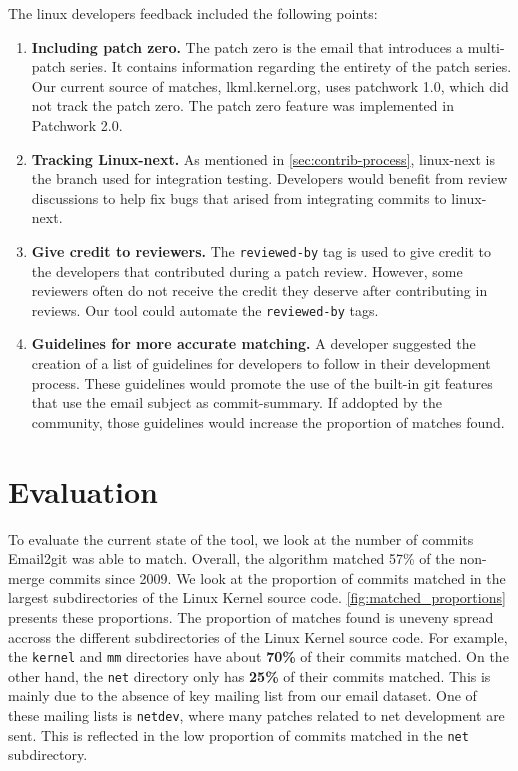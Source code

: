 The linux developers feedback included the following points:
\begin{enumerate}
	\item \textbf{Including patch zero.} The patch zero is the email that introduces a multi-patch series. It contains information regarding the entirety of the patch series. Our current source of matches, lkml.kernel.org, uses patchwork 1.0, which did not track the patch zero. The patch zero feature was implemented in Patchwork 2.0.

	\item \textbf{Tracking Linux-next.} As mentioned in \autoref{sec:contrib-process}, linux-next is the branch used for integration testing. Developers would benefit from review discussions to help fix bugs that arised from integrating commits to linux-next. 

	\item \textbf{Give credit to reviewers.} The \texttt{reviewed-by} tag is used to give credit to the developers that contributed during a patch review. However, some reviewers often do not receive the credit they deserve after contributing in reviews. Our tool could automate the \texttt{reviewed-by} tags.

	\item \textbf{Guidelines for more accurate matching.} A developer suggested the creation of a list of guidelines for developers to follow in their development process. These guidelines would promote the use of the built-in git features that use the email subject as commit-summary. If addopted by the community, those guidelines would increase the proportion of matches found. 
\end{enumerate}


\section{Evaluation}

To evaluate the current state of the tool, we look at the number of commits Email2git was able to match. Overall, the algorithm matched 57\% of the non-merge commits since 2009. We look at the proportion of commits matched in the largest subdirectories of the Linux Kernel source code. \autoref{fig:matched_proportions} presents these proportions. The proportion of matches found is uneveny spread accross the different subdirectories of the Linux Kernel source code. For example, the \texttt{kernel} and \texttt{mm} directories have about \textbf{70\%} of their commits matched. On the other hand, the \texttt{net} directory only has \textbf{25\%} of their commits matched. This is mainly due to the absence of key mailing list from our email dataset. One of these mailing lists is \texttt{netdev}, where many patches related to net development are sent. This is reflected in the low proportion of commits matched in the \texttt{net} subdirectory. 


